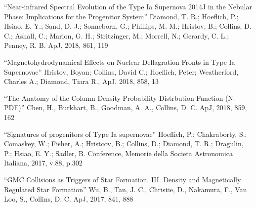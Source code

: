\medskip
\noindent
``Near-infrared Spectral Evolution of the Type Ia Supernova 2014J in the Nebular
Phase: Implications for the Progenitor System''
Diamond, T. R.; Hoeflich, P.; Hsiao, E. Y.; Sand, D. J.; Sonneborn, G.;
Phillips, M. M.; Hristov, B.; Collins, D. C.; Ashall, C.; Marion, G. H.;
Stritzinger, M.; Morrell, N.; Gerardy, C. L.; Penney, R. B.
ApJ, 2018, 861, 119

\medskip
\noindent
``Magnetohydrodynamical Effects on Nuclear Deflagration Fronts in Type Ia Supernovae''
Hristov, Boyan; Collins, David C.; Hoeflich, Peter; Weatherford, Charles A.; Diamond, Tiara R., 
ApJ, 2018, 858, 13


\medskip
\noindent
``The Anatomy of the Column Density Probability Distrbution Function (N-PDF)''
Chen, H., Burkhart, B., Goodman, A. A., Collins, D. C. 
ApJ, 2018, 859, 162

\medskip
\noindent
``Signatures of progenitors of Type Ia supernovae''
Hoeflich, P.; Chakraborty, S.; Comaskey, W.; Fisher, A.; Hristcov, B.; Collins, D.; Diamond, T. R.; Dragulin, P.; Hsiao, E. Y.; Sadler, B.
Conference, Memorie della Societa Astronomica Italiana, 2017, v.88, p.302

\medskip
\noindent
``GMC Collisions as Triggers of Star Formation. III. Density and Magnetically Regulated Star Formation''
Wu, B., Tan, J. C., Christie, D., Nakamura, F., Van Loo, S., Collins, D. C. 
ApJ, 2017, 841, 888

